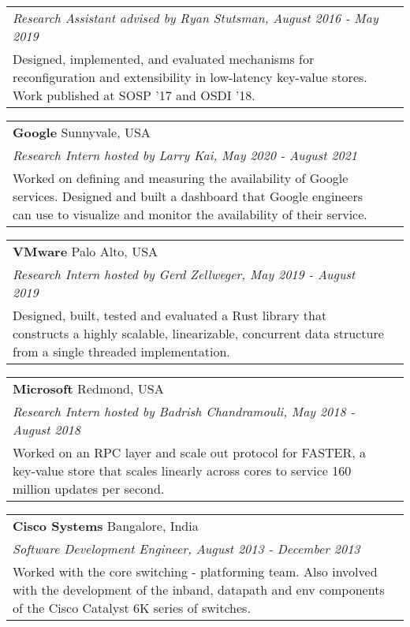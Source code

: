 \documentclass[margin,line]{res}
\begin{document}
\begin{resume}
\vspace{-7pt}
\begin{tabular}{@{}p{5.5in}p{4in}}
{\small\em Research Assistant advised by Ryan Stutsman, August 2016 - May 2019}\\
{\small Designed, implemented, and evaluated mechanisms for
reconfiguration and extensibility in low-latency key-value stores. Work
published at SOSP '17 and OSDI '18.}
\end{tabular}

\vspace{-7pt}
\begin{tabular}{@{}p{5.5in}p{4in}}
{\bf Google} \dotfill Sunnyvale, USA \\
{\small\em Research Intern hosted by Larry Kai, May 2020 - August 2021}\\
{\small Worked on defining and measuring the availability of Google
services. Designed and built a dashboard that Google engineers
can use to visualize and monitor the availability of their service.}
\end{tabular}

\vspace{-7pt}
\begin{tabular}{@{}p{5.5in}p{4in}}
{\bf VMware} \dotfill Palo Alto, USA \\
{\small\em Research Intern hosted by Gerd Zellweger, May 2019 - August 2019}\\
{\small
Designed,
built, tested and evaluated a Rust library that constructs a highly scalable, linearizable,
concurrent data
structure from a single threaded implementation.}
\end{tabular}

\vspace{-7pt}
\begin{tabular}{@{}p{5.5in}p{4in}}
{\bf Microsoft} \dotfill Redmond, USA \\
{\small\em Research Intern hosted by Badrish Chandramouli, May 2018 - August 2018}\\
{\small Worked on an RPC layer and scale out protocol for FASTER, a
key-value store that scales linearly across cores to service 160 million
updates per second.}
\end{tabular}

\vspace{-7pt}
\begin{tabular}{@{}p{5.5in}p{4in}}
{\bf Cisco Systems} \dotfill Bangalore, India \\
{\small\em Software Development Engineer, August 2013 - December 2013}\\
{\small Worked with the core switching - platforming team. Also involved with the
development of the inband, datapath and env components of the
Cisco Catalyst 6K series of switches.}
\end{tabular}


\end{resume}
\end{document}
